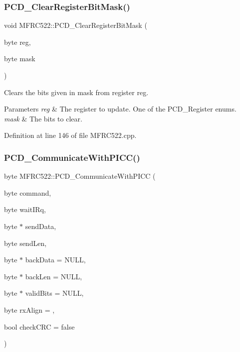 \subsubsection{\texorpdfstring{P\+C\+D\+\_\+\+Clear\+Register\+Bit\+Mask()}{PCD\_ClearRegisterBitMask()}}
{\footnotesize\ttfamily void M\+F\+R\+C522\+::\+P\+C\+D\+\_\+\+Clear\+Register\+Bit\+Mask (\begin{DoxyParamCaption}\item[{byte}]{reg,  }\item[{byte}]{mask }\end{DoxyParamCaption})}

Clears the bits given in mask from register reg. 
\begin{DoxyParams}{Parameters}
{\em reg} & The register to update. One of the P\+C\+D\+\_\+\+Register enums. \\
\hline
{\em mask} & The bits to clear. \\
\hline
\end{DoxyParams}


Definition at line 146 of file M\+F\+R\+C522.\+cpp.

\mbox{\label{class_m_f_r_c522_a731cc27ae35b1bba2d2c9d2af28b5c23}} 
\subsubsection{\texorpdfstring{P\+C\+D\+\_\+\+Communicate\+With\+P\+I\+C\+C()}{PCD\_CommunicateWithPICC()}}
{\footnotesize\ttfamily byte M\+F\+R\+C522\+::\+P\+C\+D\+\_\+\+Communicate\+With\+P\+I\+CC (\begin{DoxyParamCaption}\item[{byte}]{command,  }\item[{byte}]{wait\+I\+Rq,  }\item[{byte $\ast$}]{send\+Data,  }\item[{byte}]{send\+Len,  }\item[{byte $\ast$}]{back\+Data = {\ttfamily NULL},  }\item[{byte $\ast$}]{back\+Len = {\ttfamily NULL},  }\item[{byte $\ast$}]{valid\+Bits = {\ttfamily NULL},  }\item[{byte}]{rx\+Align = {},  }\item[{bool}]{check\+C\+RC = {\ttfamily false} }\end{DoxyParamCaption})}

